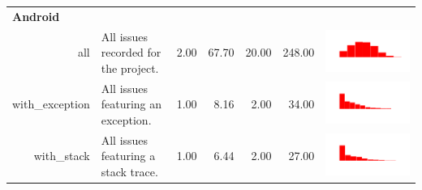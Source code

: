 \begin{table}[ht]
\begin{tabular}{rp{27em}rrrrc}
   \hline
   \multicolumn{2}{l}{\bfseries{Android}}\\
   all & All issues recorded for the project. & 2.00 & 67.70 & 20.00 & 248.00 & \includegraphics[scale = 0.1, clip = true, trim= 50px 60px 50px 60px]{hist-5d4a87daa44c63097df9bb1f3506d541.pdf} \\ 
  with\_exception & All issues featuring an exception. & 1.00 & 8.16 & 2.00 & 34.00 & \includegraphics[scale = 0.1, clip = true, trim= 50px 60px 50px 60px]{hist-bf73235d0503f937ef6f36c28cf1ba0d.pdf} \\ 
  with\_stack & All issues featuring a stack trace. & 1.00 & 6.44 & 2.00 & 27.00 & \includegraphics[scale = 0.1, clip = true, trim= 50px 60px 50px 60px]{hist-528cb6be67074e6e2c22d11245920e13.pdf} \\ 

\end{tabular}
\end{table}
